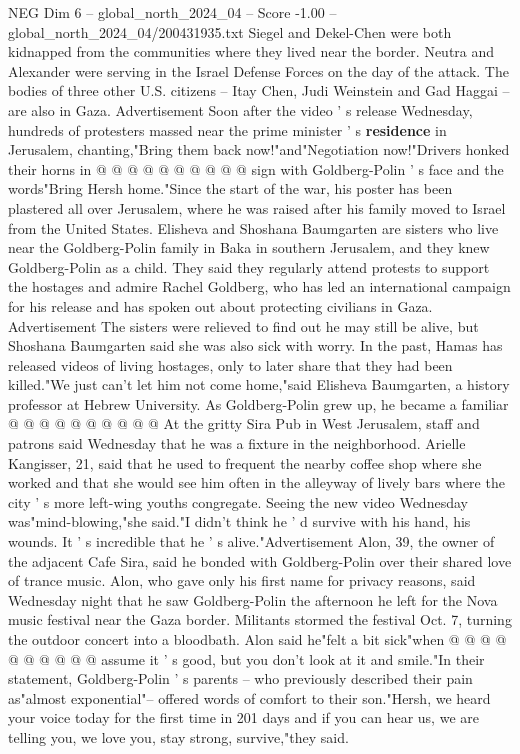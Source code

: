 \begin{textsample}{NEG Dim 6 – global\_north\_2024\_04 – Score -1.00 – global\_north\_2024\_04/200431935.txt}
Siegel and Dekel-Chen were both kidnapped from the communities where they lived near the border.
Neutra and Alexander were serving in the Israel Defense Forces on the day of the attack.
The bodies of three other U.S. citizens -- Itay Chen, Judi Weinstein and Gad Haggai -- are also in Gaza.
Advertisement Soon after the video ' s release Wednesday, hundreds of protesters massed near the prime minister ' s \textbf{residence} in Jerusalem, chanting,"Bring them back now!"and"Negotiation now!"Drivers honked their horns in @ @ @ @ @ @ @ @ @ @ sign with Goldberg-Polin ' s face and the words"Bring Hersh home."Since the start of the war, his poster has been plastered all over Jerusalem, where he was raised after his family moved to Israel from the United States.
Elisheva and Shoshana Baumgarten are sisters who live near the Goldberg-Polin family in Baka in southern Jerusalem, and they knew Goldberg-Polin as a child.
They said they regularly attend protests to support the hostages and admire Rachel Goldberg, who has led an international campaign for his release and has spoken out about protecting civilians in Gaza.
Advertisement The sisters were relieved to find out he may still be alive, but Shoshana Baumgarten said she was also sick with worry.
In the past, Hamas has released videos of living hostages, only to later share that they had been killed."We just can't let him not come home,"said Elisheva Baumgarten, a history professor at Hebrew University.
As Goldberg-Polin grew up, he became a familiar @ @ @ @ @ @ @ @ @ @ At the gritty Sira Pub in West Jerusalem, staff and patrons said Wednesday that he was a fixture in the neighborhood.
Arielle Kangisser, 21, said that he used to frequent the nearby coffee shop where she worked and that she would see him often in the alleyway of lively bars where the city ' s more left-wing youths congregate.
Seeing the new video Wednesday was"mind-blowing,"she said."I didn't think he ' d survive with his hand, his wounds.
It ' s incredible that he ' s alive."Advertisement Alon, 39, the owner of the adjacent Cafe Sira, said he bonded with Goldberg-Polin over their shared love of trance music.
Alon, who gave only his first name for privacy reasons, said Wednesday night that he saw Goldberg-Polin the afternoon he left for the Nova music festival near the Gaza border.
Militants stormed the festival Oct. 7, turning the outdoor concert into a bloodbath.
Alon said he"felt a bit sick"when @ @ @ @ @ @ @ @ @ @ assume it ' s good, but you don't look at it and smile."In their statement, Goldberg-Polin ' s parents -- who previously described their pain as"almost exponential"-- offered words of comfort to their son."Hersh, we heard your voice today for the first time in 201 days and if you can hear us, we are telling you, we love you, stay strong, survive,"they said.

\end{textsample}
